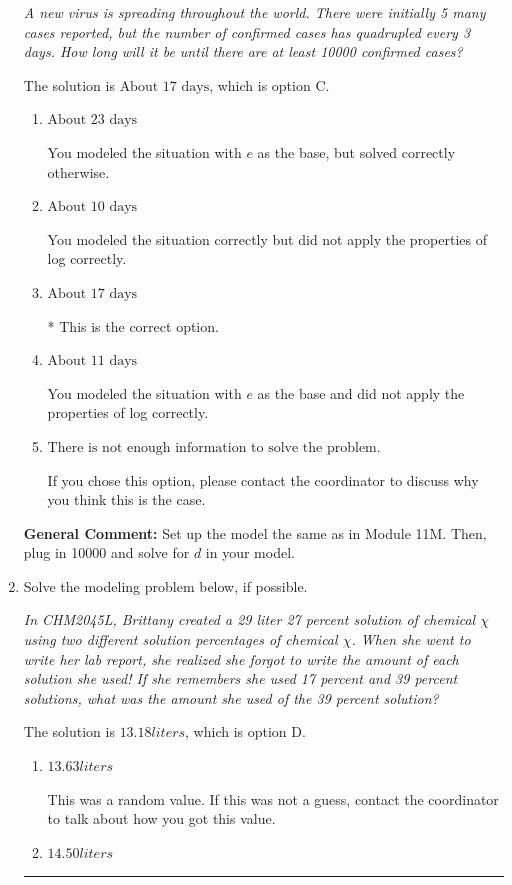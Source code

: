 \documentclass{extbook}[14pt]
\newcommand{\litem}[1]{\item #1

\rule{\textwidth}{0.4pt}}
\begin{document}
\begin{enumerate}
{\begin{center}
    \textit{ A new virus is spreading throughout the world. There were initially 5 many cases reported, but the number of confirmed cases has quadrupled every 3 days. How long will it be until there are at least 10000 confirmed cases? }
\end{center}
The solution is \( \text{About } 17 \text{ days} \), which is option C.\begin{enumerate}[label=\Alph*.]
\item \( \text{About } 23 \text{ days} \)

You modeled the situation with $e$ as the base, but solved correctly otherwise.
\item \( \text{About } 10 \text{ days} \)

You modeled the situation correctly but did not apply the properties of log correctly.
\item \( \text{About } 17 \text{ days} \)

* This is the correct option.
\item \( \text{About } 11 \text{ days} \)

You modeled the situation with $e$ as the base and did not apply the properties of log correctly.
\item \( \text{There is not enough information to solve the problem.} \)

If you chose this option, please contact the coordinator to discuss why you think this is the case.
\end{enumerate}

\textbf{General Comment:} Set up the model the same as in Module 11M. Then, plug in 10000 and solve for $d$ in your model.
}
\litem{
Solve the modeling problem below, if possible.

\begin{center}
    \textit{ In CHM2045L, Brittany created a 29 liter 27 percent solution of chemical $\chi$ using two different solution percentages of chemical $\chi$. When she went to write her lab report, she realized she forgot to write the amount of each solution she used! If she remembers she used 17 percent and 39 percent solutions, what was the amount she used of the 39 percent solution? }
\end{center}
The solution is \( 13.18 liters \), which is option D.\begin{enumerate}[label=\Alph*.]
\item \( 13.63 liters \)

This was a random value. If this was not a guess, contact the coordinator to talk about how you got this value.
\item \( 14.50 liters \)


\end{enumerate}}
\end{enumerate}
\end{document}
